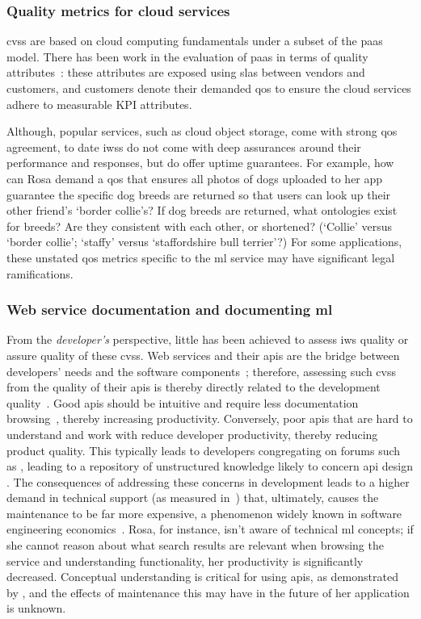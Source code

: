 \subsubsection{Quality metrics for cloud services}
 
\glspl{cvs} are based on cloud computing fundamentals under a subset of the \gls{paas} model.  There has been work in the evaluation of \gls{paas} in terms of quality attributes~\citep{Garg:2011gw}: these attributes are exposed using \glspl{sla} between vendors and customers, and customers denote their demanded \gls{qos} to ensure the cloud services adhere to measurable KPI attributes. 

Although, popular services, such as cloud object storage, come with strong \gls{qos} agreement, to date \glspl{iws} do not come with deep assurances around their performance and responses, but do offer uptime guarantees. For example, how can Rosa demand a \gls{qos} that ensures all photos of dogs uploaded to her app guarantee the specific dog breeds are returned so that users can look up their other friend's `border collie's? If dog breeds are returned, what ontologies exist for breeds? Are they consistent with each other, or shortened? (`Collie' versus `border collie'; `staffy' versus `staffordshire bull terrier'?) For some applications, these unstated \gls{qos} metrics specific to the \gls{ml} service may have significant legal ramifications.

\subsubsection{Web service documentation and documenting \gls{ml}}

From the \textit{developer's} perspective, little has been achieved to assess \gls{iws} quality or assure quality of these \glspl{cvs}. Web services and their \glspl{api} are the bridge between developers' needs and the software components~\citep{Arnold:2005vc}; therefore, assessing such \glspl{cvs} from the quality of their \glspl{api} is thereby directly related to the development quality~\citep{Ko:2004td}. Good \glspl{api} should be intuitive and require less documentation browsing~\citep{Piccioni:2013em}, thereby increasing productivity. Conversely, poor \glspl{api} that are hard to understand and work with reduce developer productivity, thereby reducing product quality. This typically leads to developers congregating on forums such as , leading to a repository of unstructured knowledge likely to concern \gls{api} design \citep{7180082}. The consequences of addressing these concerns in development leads to a higher demand in technical support (as measured in~\citep{Henning:2009hz}) that, ultimately, causes the maintenance to be far more expensive, a phenomenon widely known in software engineering economics~\citep{Boehm:1981ua}. Rosa, for instance, isn't aware of technical \gls{ml} concepts; if she cannot reason about what search results are relevant when browsing the service and understanding functionality, her productivity is significantly decreased. Conceptual understanding is critical for using \glspl{api}, as demonstrated by \citeauthor{Ko:2011fb}, and the effects of maintenance this may have in the future of her application is unknown.

